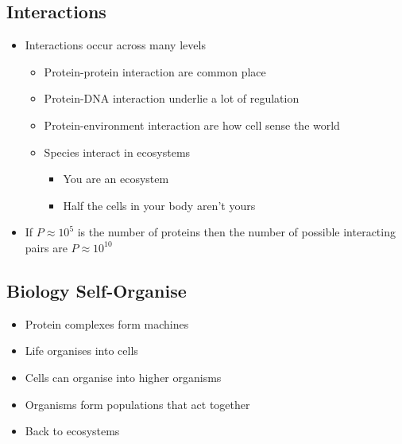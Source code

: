 
\begin{slide}
\section{Interactions}

\begin{PauseHighLight}
  \begin{itemize}
  \item Interactions occur across many levels
    \begin{itemize}
    \item Protein-protein interaction are common place\pause
    \item Protein-DNA interaction underlie a lot of regulation\pause
    \item Protein-environment interaction are how cell sense the world\pause
    \item Species interact in ecosystems\pause
      \begin{itemize}
      \item You are an ecosystem\pauseb
      \item Half the cells in your body aren't yours\pauseb
      \end{itemize}
    \end{itemize}
  \item If $P\approx10^5$ is the number of proteins then the number of possible
    interacting pairs are $P\approx10^{10}$\pause
  \end{itemize}
\end{PauseHighLight}

\end{slide}


\begin{slide}
\section{Biology Self-Organise}

\begin{PauseHighLight}
  \begin{itemize}
  \item Protein complexes form machines\pause
  \item Life organises into cells\pause
  \item Cells can organise into higher organisms\pause
  \item Organisms form populations that act together\pause
  \item Back to ecosystems\pause
  \end{itemize}
\end{PauseHighLight}

\end{slide}

